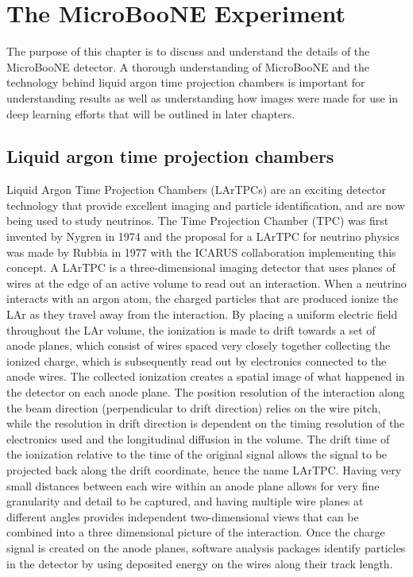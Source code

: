 \chapter{The MicroBooNE Experiment}\label{ch:microboone}
The purpose of this chapter is to discuss and understand the details of the MicroBooNE detector. A thorough understanding of MicroBooNE and the technology behind liquid argon time projection chambers is important for understanding results as well as understanding how images were made for use in deep learning efforts that will be outlined in later chapters.   

\section{Liquid argon time projection chambers}
Liquid Argon Time Projection Chambers (LArTPCs) are an exciting detector technology that provide excellent imaging and particle identification, and are now being used to study neutrinos. The Time Projection Chamber (TPC) was first invented by Nygren in 1974 \cite{nygren} and the proposal for a LArTPC for neutrino physics was made by Rubbia \cite{rubbia} in 1977 with the ICARUS collaboration implementing this concept\cite{icaraus}. A LArTPC is a three-dimensional imaging detector that uses planes of wires at the edge of an active volume to read out an interaction. When a neutrino interacts with an argon atom, the charged particles that are produced ionize the LAr as they travel away from the interaction. By placing a uniform electric field throughout the LAr volume, the ionization is made to drift towards a set of anode planes, which consist of wires spaced very closely together collecting the ionized charge, which is subsequently read out by electronics connected to the anode wires. The collected ionization creates a spatial image of what happened in the detector on each anode plane. The position resolution of the interaction along the beam direction (perpendicular to drift direction) relies on the wire pitch, while the resolution in drift direction is dependent on the timing resolution of the electronics used and the longitudinal diffusion in the volume. The drift time of the ionization relative to the time of the original signal allows the signal to be projected back along the drift coordinate, hence the name LArTPC. Having very small distances between each wire within an anode plane allows for very fine granularity and detail to be captured, and having multiple wire planes at different angles provides independent two-dimensional views that can be combined into a three dimensional picture of the interaction. Once the charge signal is created on the anode planes, software analysis packages identify particles in the detector by using deposited energy on the wires along their track length. 
